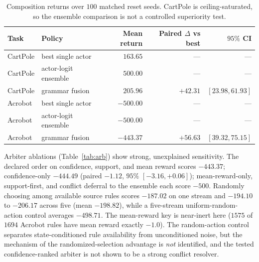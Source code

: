 \documentclass[11pt]{article}
\begin{document}
\begin{table}[t]
\centering\small
\begin{tabular}{@{}llrrr@{}}
\toprule
Task & Policy & Mean return & Paired $\Delta$ vs best & $95\%$ CI \\
\midrule
CartPole & best single actor   & $163.65$ & --- & --- \\
CartPole & actor-logit ensemble & $500.00$ & --- & --- \\
CartPole & grammar fusion       & $205.96$ & $+42.31$ & $[23.98,61.93]$ \\
Acrobot  & best single actor    & $-500.00$ & --- & --- \\
Acrobot  & actor-logit ensemble & $-500.00$ & --- & --- \\
Acrobot  & grammar fusion       & $-443.37$ & $+56.63$ & $[39.32,75.15]$ \\
\bottomrule
\end{tabular}
\caption{Composition returns over $100$ matched reset seeds. CartPole is ceiling-saturated, so the
ensemble comparison is not a controlled superiority test.}
\label{tab:returns}
\end{table}

Arbiter ablations (Table~\ref{tab:arb}) show strong, unexplained sensitivity. The declared
order on confidence, support, and mean reward scores $-443.37$; confidence-only $-444.49$ (paired $-1.12$,
$95\%$ $[-3.16,+0.06]$); mean-reward-only, support-first, and conflict deferral to the ensemble
each score $-500$. Randomly choosing among available source rules scores $-187.02$ on one stream
and $-194.10$ to $-206.17$ across five (mean $-198.82$), while a five-stream uniform-random-action
control averages $-498.71$. The mean-reward key is near-inert here ($1575$ of $1694$ Acrobot rules
have mean reward exactly $-1.0$). The random-action control separates state-conditioned rule
availability from unconditioned noise, but the mechanism of the randomized-selection advantage is
\emph{not} identified, and the tested confidence-ranked arbiter is not shown to be a strong
conflict resolver.
\end{document}

